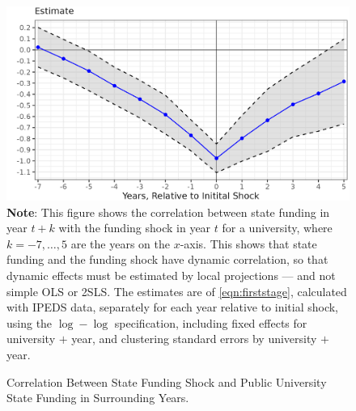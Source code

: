 \begin{figure}[H]
    \centering
    \singlespacing
    \caption{Correlation Between State Funding Shock and Public University State Funding in Surrounding Years.}
    \includegraphics[width=\textwidth]{figures/lag-firststage.png}
    \label{fig:lag-firststage}
    \justify
    \footnotesize
    \textbf{Note}:
    This figure shows the correlation between state funding in year $t+k$ with the funding shock in year $t$ for a university, where $k = -7, \hdots, 5$ are the years on the $x$-axis.
    This shows that state funding and the funding shock have dynamic correlation, so that dynamic effects must be estimated by local projections --- and not simple OLS or 2SLS.
    The estimates are of \eqref{eqn:firststage}, calculated with IPEDS data, separately for each year relative to initial shock, using the $\log-\log$ specification, including fixed effects for university $+$ year, and clustering standard errors by university $+$ year.
\end{figure}

